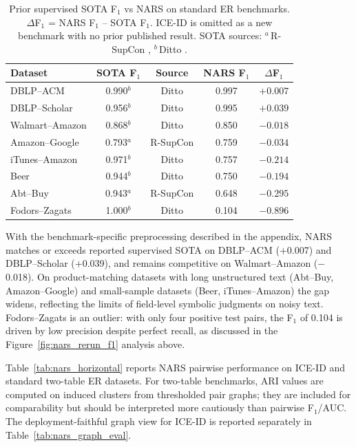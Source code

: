 \documentclass{article}
\begin{document}
\begin{table}[H]
  \centering
  \small
    \caption{Prior supervised SOTA F$_1$ vs NARS on standard ER benchmarks. $\Delta$F$_1$ = NARS F$_1$ -- SOTA F$_1$. ICE-ID is omitted as a new benchmark with no prior published result. SOTA sources: $^a$\,R-SupCon \cite{Peeters2022}, $^b$\,Ditto \cite{Li2020DeepEM}.}
  \begin{tabular}{lcccc}
    \toprule
    Dataset            & SOTA F$_1$ & Source & NARS F$_1$ & $\Delta$F$_1$ \\
    \midrule
    DBLP--ACM           & 0.990$^b$  & Ditto & 0.997 & $+0.007$ \\
    DBLP--Scholar       & 0.956$^b$  & Ditto & 0.995 & $+0.039$ \\
    Walmart--Amazon     & 0.868$^b$  & Ditto & 0.850 & $-0.018$ \\
    Amazon--Google      & 0.793$^a$  & R-SupCon & 0.759 & $-0.034$ \\
    iTunes--Amazon      & 0.971$^b$  & Ditto & 0.757 & $-0.214$ \\
    Beer                & 0.944$^b$  & Ditto & 0.750 & $-0.194$ \\
    Abt--Buy            & 0.943$^a$  & R-SupCon & 0.648 & $-0.295$ \\
    Fodors--Zagats      & 1.000$^b$  & Ditto & 0.104 & $-0.896$ \\
    \bottomrule
  \end{tabular}

  \label{tab:sota_horizontal}
\end{table}

With the benchmark-specific preprocessing described in the appendix, NARS matches or exceeds reported supervised SOTA on DBLP--ACM ($+$0.007) and DBLP--Scholar ($+$0.039), and remains competitive on Walmart--Amazon ($-$0.018). On product-matching datasets with long unstructured text (Abt--Buy, Amazon--Google) and small-sample datasets (Beer, iTunes--Amazon) the gap widens, reflecting the limits of field-level symbolic judgments on noisy text. Fodors--Zagats is an outlier: with only four positive test pairs, the F$_1$ of 0.104 is driven by low precision despite perfect recall, as discussed in the Figure~\ref{fig:nars_rerun_f1} analysis above.


Table~\ref{tab:nars_horizontal} reports NARS pairwise performance on ICE-ID and standard two-table ER datasets. For two-table benchmarks, ARI values are computed on induced clusters from thresholded pair graphs; they are included for comparability but should be interpreted more cautiously than pairwise F$_1$/AUC. The deployment-faithful graph view for ICE-ID is reported separately in Table~\ref{tab:nars_graph_eval}.
\end{document}
